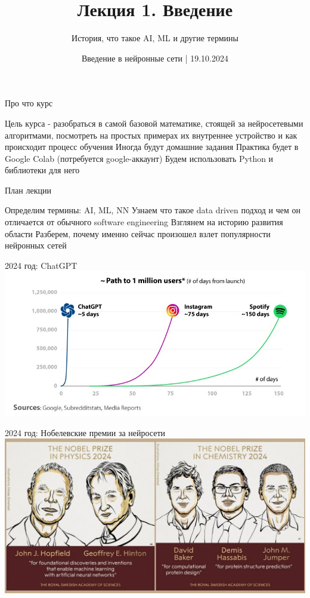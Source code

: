\documentclass[aspectratio=169, professionalfonts]{beamer}
\title{Лекция 1. Введение}
\subtitle{История, что такое AI, ML и другие термины}
\date{Введение в нейронные сети | 19.10.2024}
\begin{document}
\maketitle


\begin{frame}{Про что курс}
    \begin{outline}
        \1 Цель курса - разобраться в самой базовой математике, стоящей за нейросетевыми алгоритмами, посмотреть на простых примерах их внутреннее устройство и как происходит процесс обучения
        \1 Иногда будут домашние задания
        \1 Практика будет в Google Colab (потребуется google-аккаунт)
        \1 Будем использовать Python и библиотеки для него
    \end{outline}
\end{frame}

\begin{frame}{План лекции}
    \begin{outline}
        \1 Определим термины: AI, ML, NN
        \1 Узнаем что такое data driven подход и чем он отличается от обычного
        software engineering
        \1 Взглянем на историю развития области
        \1 Разберем, почему именно сейчас произошел взлет популярности нейронных сетей
    \end{outline}
\end{frame}

\begin{frame}{2024 год: ChatGPT}
    \centering
    \includegraphics[width=.8\linewidth]{figures/fig0-chatgpt-growth.jpg}
\end{frame}

\begin{frame}{2024 год: Нобелевские премии за нейросети}
    \centering
    \includegraphics[width=.85\linewidth]{figures/fig1-2024-nobel-prize.jpg}
\end{frame}
\end{document}
